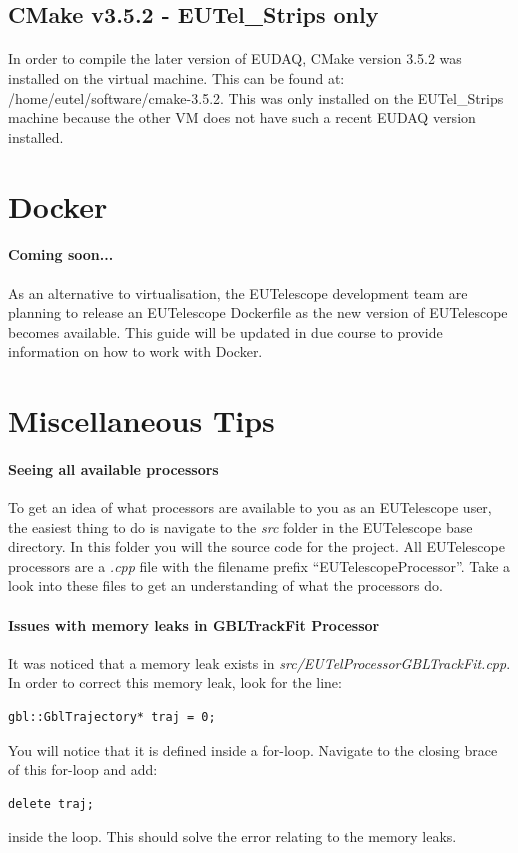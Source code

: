 \documentclass[11pt]{article}
\begin{document}
\subsection{CMake v3.5.2 - EUTel\_Strips only}
\paragraph{}
In order to compile the later version of EUDAQ, CMake version 3.5.2 was installed on the virtual machine. This can be found at: /home/eutel/software/cmake-3.5.2. This was only installed on the EUTel\_Strips machine because the other VM does not have such a recent EUDAQ version installed.
\section{Docker}
\paragraph{Coming soon...}
As an alternative to virtualisation, the EUTelescope development team are planning to release an EUTelescope Dockerfile as the new version of EUTelescope becomes available. This guide will be updated in due course to provide information on how to work with Docker.
\section{Miscellaneous Tips}
\paragraph{Seeing all available processors}
To get an idea of what processors are available to you as an EUTelescope user, the easiest thing to do is navigate to the \textit{src} folder in the EUTelescope base directory. In this folder you will the source code for the project. All EUTelescope processors are a \textit{.cpp} file with the filename prefix ``EUTelescopeProcessor''. Take a look into these files to get an understanding of what the processors do.
\paragraph{Issues with memory leaks in GBLTrackFit Processor} It was noticed that a memory leak exists in \textit{src/EUTelProcessorGBLTrackFit.cpp}. In order to correct this memory leak, look for the line:
\begin{verbatim}
gbl::GblTrajectory* traj = 0;
\end{verbatim}
You will notice that it is defined inside a for-loop. Navigate to the closing brace of this for-loop and add:
\begin{verbatim}
delete traj;
\end{verbatim}
inside the loop. This should solve the error relating to the memory leaks.
\end{document}
